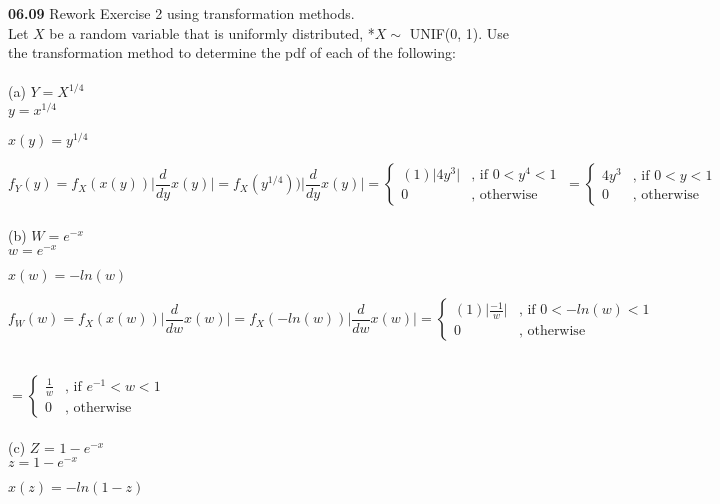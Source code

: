 \documentclass[letterpaper,11pt]{article}
\begin{document}
\textbf{06.09} Rework Exercise 2 using transformation methods. 
\vspace{0.25in}\\
Let $X$ be a random variable that is uniformly distributed, *$X \sim$ UNIF(0, 1). Use the transformation
method to determine the pdf of each of the following:\\
\vspace{0.25in}\\ 
(a) $Y = X^{1/4}$ \\

$y = x^{1/4}$\par
$x(y) = y^{1/4}$

$f_Y(y) = f_X(x(y)) \bigg| \dfrac{d}{dy} x(y) \bigg|
= f_X(y^{1/4})) \bigg| \dfrac{d}{dy} x(y) \bigg|
=\begin{cases}
	(1) \Big| 4y^3 \Big| & \text{,	if }0<y^4<1\\
	0 & \text{,		otherwise}
\end{cases}\
=\begin{cases}
	4y^3  & \text{,	if }0<y<1 \\
	0 & \text{,		otherwise}
\end{cases}
$\\
\vspace{0.25in}\\
(b) $W = e^{-x}$\\

$w = e^{-x}$\par 
$x(w) = -ln(w)$

$f_W(w) = f_X(x(w)) \bigg| \dfrac{d}{dw} x(w) \bigg|
= f_X(-ln(w)) \bigg| \dfrac{d}{dw} x(w) \bigg|
=\begin{cases}
	(1) \Big| \frac{-1}{w} \Big|  & \text{,	if } 0<-ln(w)<1 \\
	0 & \text{,		otherwise}
\end{cases} $\\ 
\vspace{1mm}\\
\par \hspace{3.55in}
$=\begin{cases}
	\frac{1}{w}  & \text{,	if } e^{-1}<w<1 \\
	0 & \text{,		otherwise}
\end{cases}
$\\
\vspace{0.25in}\\
(c) $Z$ = $1-e^{-x}$\\

$z = 1-e^{-x}$\par
$x(z) = -ln(1-z)$
\end{document}

